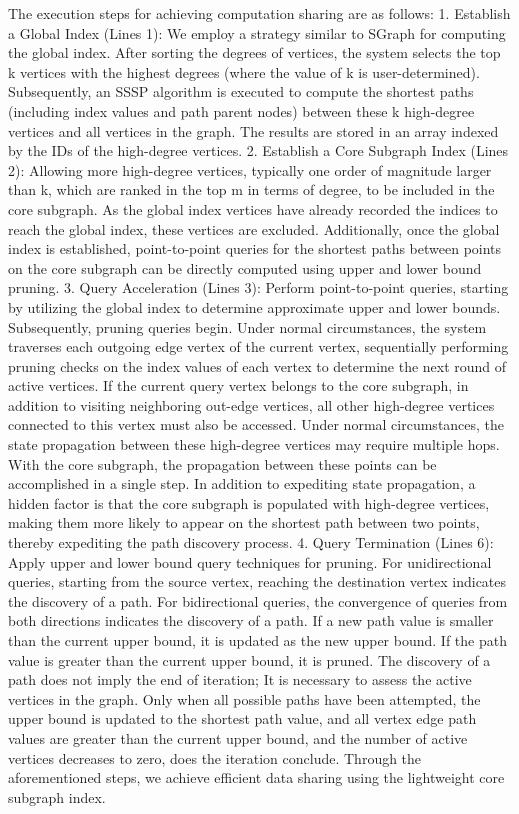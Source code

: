 \documentclass[lettersize,journal]{IEEEtran} %
\begin{document}
The execution steps for achieving computation sharing are as follows: 1. Establish a Global Index (Lines 1): We employ a strategy similar to SGraph for computing the global index. After sorting the degrees of vertices, the system selects the top k vertices with the highest degrees (where the value of k is user-determined). Subsequently, an SSSP algorithm is executed to compute the shortest paths (including index values and path parent nodes) between these k high-degree vertices and all vertices in the graph. The results are stored in an array indexed by the IDs of the high-degree vertices. 2. Establish a Core Subgraph Index (Lines 2): Allowing more high-degree vertices, typically one order of magnitude larger than k, which are ranked in the top m in terms of degree, to be included in the core subgraph. As the global index vertices have already recorded the indices to reach the global index, these vertices are excluded. Additionally, once the global index is established, point-to-point queries for the shortest paths between points on the core subgraph can be directly computed using upper and lower bound pruning. 3. Query Acceleration (Lines 3): Perform point-to-point queries, starting by utilizing the global index to determine approximate upper and lower bounds. Subsequently, pruning queries begin. Under normal circumstances, the system traverses each outgoing edge vertex of the current vertex, sequentially performing pruning checks on the index values of each vertex to determine the next round of active vertices. If the current query vertex belongs to the core subgraph, in addition to visiting neighboring out-edge vertices, all other high-degree vertices connected to this vertex must also be accessed. Under normal circumstances, the state propagation between these high-degree vertices may require multiple hops. With the core subgraph, the propagation between these points can be accomplished in a single step. In addition to expediting state propagation, a hidden factor is that the core subgraph is populated with high-degree vertices, making them more likely to appear on the shortest path between two points, thereby expediting the path discovery process. 4. Query Termination (Lines 6): Apply upper and lower bound query techniques for pruning. For unidirectional queries, starting from the source vertex, reaching the destination vertex indicates the discovery of a path. For bidirectional queries, the convergence of queries from both directions indicates the discovery of a path. If a new path value is smaller than the current upper bound, it is updated as the new upper bound. If the path value is greater than the current upper bound, it is pruned. The discovery of a path does not imply the end of iteration; It is necessary to assess the active vertices in the graph. Only when all possible paths have been attempted, the upper bound is updated to the shortest path value, and all vertex edge path values are greater than the current upper bound, and the number of active vertices decreases to zero, does the iteration conclude. Through the aforementioned steps, we achieve efficient data sharing using the lightweight core subgraph index.
\end{document}
